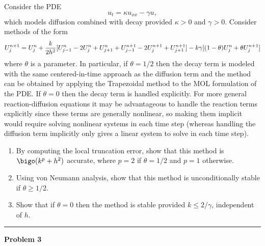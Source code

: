 \documentclass[10pt]{article}
\begin{document}
Consider the PDE
\begin{equation}\label{diffdecay}
u_t = \kappa u_{xx} - \gamma u,
\end{equation}
which models diffusion combined with decay provided $\kappa>0$ and $\gamma>0$.  
Consider methods of the form
\begin{equation}\label{ddtheta}
U_j^{n+1} =U_j^n+{k\over 2h^2} [U_{j-1}^n-2U_j^n +U_{j+1}^n
+U_{j-1}^{n+1} - 2U_j^{n+1} + U_{j+1}^{n+1}]
- k\gamma[(1-\theta)U_j^n + \theta U_j^{n+1}]
\end{equation}
where $\theta$ is a parameter.  In particular, if $\theta=1/2$ then the
decay term is modeled with the same centered-in-time approach as the
diffusion term and the method can be obtained by applying the Trapezoidal
method to the MOL formulation of the PDE.   If $\theta=0$ then the decay
term is handled explicitly.  For more general reaction-diffusion equations
it may be advantageous to handle the reaction terms explicitly since these
terms are generally nonlinear, so making them implicit would require solving
nonlinear systems in each time step (whereas handling the diffusion term
implicitly only gives a linear system to solve in each time step).

\begin{enumerate}
\item By computing the local truncation error, show that this method is
$\bigo(k^p+h^2)$ accurate, where $p=2$ if $\theta = 1/2$ and $p=1$
otherwise.
\item Using von Neumann analysis, show that this method is unconditionally
stable if $\theta \geq 1/2$.
\item Show that if $\theta = 0$ then the method is stable provided $k\leq
2/\gamma$, independent of $h$.
\end{enumerate} 





\vskip 1cm
\hrule
{\bf Problem 3}  
\end{document}
